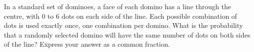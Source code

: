 In a standard set of dominoes, a face of each domino has a line through the centre, with $0$ to $6$ dots on each side of the line. Each possible combination of dots is used exactly once, one combination per domino. What is the probability that a randomly selected domino will have the same number of dots on both sides of the line? Express your answer as a common fraction.

